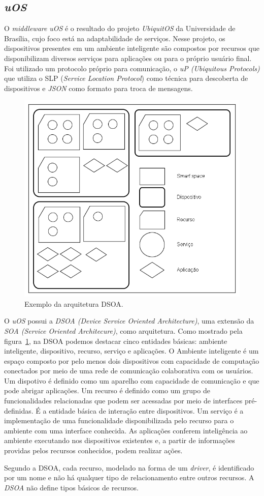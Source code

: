 \subsection{\emph{uOS}}
\label{subsec:introUos}

O \emph{middleware} \emph{uOS} é o resultado do projeto \emph{UbiquitOS} da Universidade de Brasília, cujo foco está na adaptabilidade de serviços. Nesse projeto, os dispositivos presentes em um ambiente inteligente são compostos por recursos que disponibilizam diversos serviços para aplicações ou para o próprio usuário final. Foi utilizado um protocolo próprio para comunicação, o \emph{uP (Ubiquitous Protocols)} que utiliza o SLP (\emph{Service Location Protocol}) como técnica para descoberta de dispositivos e \emph{JSON} como formato para troca de mensagens.

\begin{figure}[ht]
	\center
	\includegraphics[scale=0.6]{imagens/arquiteturaDSOA}
	\caption{Exemplo da arquitetura DSOA.}
	\label{fig:arquiteturaDSOA}
\end{figure}

O \emph{uOS} possui a \emph{DSOA (Device Service Oriented Architecture)}, uma extensão da \emph{SOA (Service Oriented Architecure)}, como arquitetura. Como mostrado pela figura~\ref{fig:arquiteturaDSOA}, na DSOA podemos destacar cinco entidades básicas: ambiente inteligente, dispositivo, recurso, serviço e aplicações. O Ambiente inteligente é um espaço composto por pelo menos dois dispositivos com capacidade de computação conectados por meio de uma rede de comunicação colaborativa com os usuários. Um dispotivo é definido como um aparelho com capacidade de comunicação e que pode abrigar aplicações. Um recurso é definido como um grupo de funcionalidades relacionadas que podem ser acessadas por meio de interfaces pré-definidas. É a entidade básica de interação entre dispositivos. Um serviço é a implementação de uma funcionalidade disponibilizada pelo recurso para o ambiente com uma interface conhecida. As aplicações conferem inteligência ao ambiente executando nos dispositivos existentes e, a partir de informações providas pelos recursos conhecidos, podem realizar ações. 

Segundo a DSOA, cada recurso, modelado na forma de um \emph{driver}, é identificado por um nome e não há qualquer tipo de relacionamento entre outros recursos. A \emph{DSOA} não define tipos básicos de recursos.	
